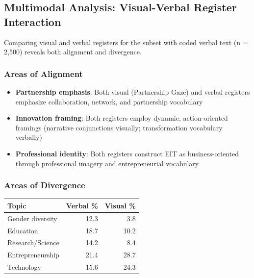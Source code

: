 \documentclass[../main.tex]{subfiles}
\begin{document}
\subsection{Multimodal Analysis: Visual-Verbal Register Interaction}

Comparing visual and verbal registers for the subset with coded verbal text (n = 2,500) reveals both alignment and divergence.

\subsubsection{Areas of Alignment}

\begin{itemize}
    \item \textbf{Partnership emphasis}: Both visual (Partnership Gaze) and verbal registers emphasize collaboration, network, and partnership vocabulary
    \item \textbf{Innovation framing}: Both registers employ dynamic, action-oriented framings (narrative conjunctions visually; transformation vocabulary verbally)
    \item \textbf{Professional identity}: Both registers construct EIT as business-oriented through professional imagery and entrepreneurial vocabulary
\end{itemize}

\subsubsection{Areas of Divergence}

\begin{margintable}
\centering
\small
\begin{tabular}{lrr}
\toprule
\textbf{Topic} & \textbf{Verbal \%} & \textbf{Visual \%} \\
\midrule
Gender diversity & 12.3 & 3.8 \\
Education & 18.7 & 10.2 \\
Research/Science & 14.2 & 8.4 \\
Entrepreneurship & 21.4 & 28.7 \\
Technology & 15.6 & 24.3 \\
\bottomrule
\end{tabular}
\caption{Verbal vs. visual emphasis}
\end{margintable}
\end{document}
